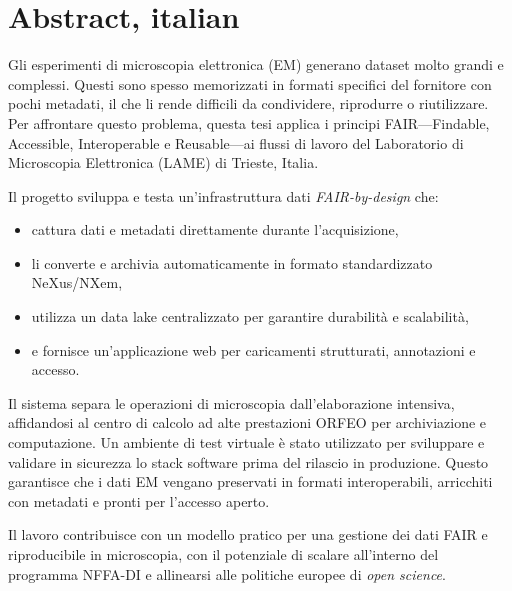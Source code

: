 \chapter{Abstract, italian}

Gli esperimenti di microscopia elettronica (EM) generano dataset molto grandi e complessi. Questi sono spesso memorizzati in formati specifici del fornitore con pochi metadati, il che li rende difficili da condividere, riprodurre o riutilizzare. Per affrontare questo problema, questa tesi applica i principi FAIR---Findable, Accessible, Interoperable e Reusable---ai flussi di lavoro del Laboratorio di Microscopia Elettronica (LAME) di Trieste, Italia.

Il progetto sviluppa e testa un'infrastruttura dati \emph{FAIR-by-design} che:
\begin{itemize}
	\item cattura dati e metadati direttamente durante l’acquisizione,
	\item li converte e archivia automaticamente in formato standardizzato NeXus/NXem,
	\item utilizza un data lake centralizzato per garantire durabilità e scalabilità,
	\item e fornisce un’applicazione web per caricamenti strutturati, annotazioni e accesso.
\end{itemize}

Il sistema separa le operazioni di microscopia dall’elaborazione intensiva, affidandosi al centro di calcolo ad alte prestazioni ORFEO per archiviazione e computazione. Un ambiente di test virtuale è stato utilizzato per sviluppare e validare in sicurezza lo stack software prima del rilascio in produzione. Questo garantisce che i dati EM vengano preservati in formati interoperabili, arricchiti con metadati e pronti per l’accesso aperto.

Il lavoro contribuisce con un modello pratico per una gestione dei dati FAIR e riproducibile in microscopia, con il potenziale di scalare all’interno del programma NFFA-DI e allinearsi alle politiche europee di \emph{open science}.

